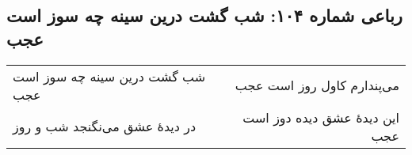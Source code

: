 \begin{center}
\section*{رباعی شماره ۱۰۴: شب گشت درین سینه چه سوز است عجب}
\label{sec:0104}
\begin{longtable}{l p{0.5cm} r}
شب گشت درین سینه چه سوز است عجب
&&
می‌پندارم کاول روز است عجب
\\
در دیدهٔ عشق می‌نگنجد شب و روز
&&
این دیدهٔ عشق دیده دوز است عجب
\\
\end{longtable}
\end{center}
